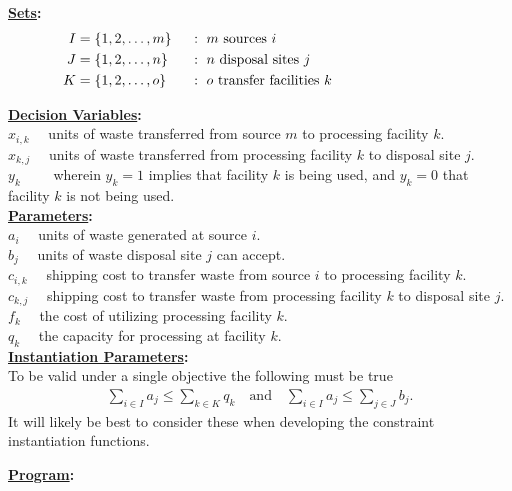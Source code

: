 \documentclass[12pt]{amsart}
\begin{document}
\textbf{\underline{Sets}:} 
\begin{alignat*}{2}
	I &= \{1,2,\ldots,m\}\ & &:\ m \text{ sources } i \hspace{30ex} \\
	J &= \{1,2,\ldots,n\}\ & &:\ n \text{ disposal sites } j  \\
	K &= \{1,2,\ldots,o\}\ & &:\ o \text{ transfer facilities } k 
\end{alignat*} 

\textbf{\underline{Decision Variables}:} \\ 

\noindent
\(x_{i,k}\quad\) units of waste transferred from source \(m\) to processing facility \(k\). \\
\(x_{k,j}\quad\) units of waste transferred from processing facility \(k\) to disposal site \(j\). \\
\(y_k\qquad\!\) wherein \(y_k=1\) implies that facility \(k\) is being used,
and \(y_k=0\) that facility \(k\) is not being used. \\

\textbf{\underline{Parameters}:} \\

\noindent
\(a_i\quad\) units of waste generated at source \(i\). \\
\(b_j\quad\) units of waste disposal site \(j\) can accept. \\
\(c_{i,k}\quad\) shipping cost to transfer waste from source \(i\) to processing facility \(k\). \\
\(c_{k,j}\quad\) shipping cost to transfer waste from processing facility \(k\) to disposal site \(j\). \\
\(f_k\quad\) the cost of utilizing processing facility \(k\). \\
\(q_k\quad\) the capacity for processing at facility \(k\). \\


\textbf{\underline{Instantiation Parameters}:} \\

To be valid under a single objective the following must be true
\begin{align*}
	\sum_{i\in I}a_j \leq \sum_{k\in K}q_k \quad\text{and}\quad
	\sum_{i\in I}a_j \leq \sum_{j\in J}b_j .
\end{align*}
It will likely be best to consider these when developing the
constraint instantiation functions.

\textbf{\underline{Program}:} \\
\end{document}
